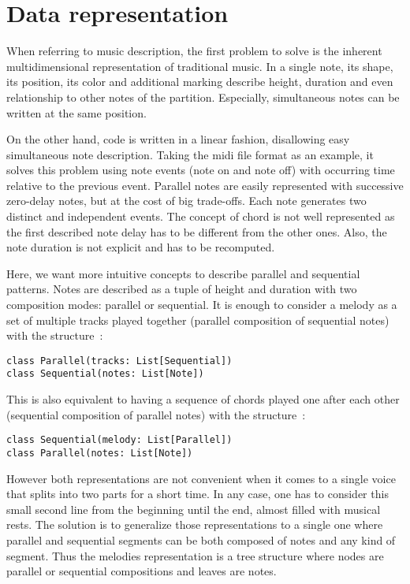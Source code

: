 \documentclass[twocolumn, 11pt]{article}
\begin{document}
\section{Data representation}

When referring to music description, the first problem to solve is the inherent multidimensional representation of traditional music. In a single note, its shape, its position, its color and additional marking describe height, duration and even relationship to other notes of the partition.
Especially, simultaneous notes can be written at the same position.

On the other hand, code is written in a linear fashion, disallowing easy simultaneous note description.
Taking the midi file format as an example, it solves this problem using note events (note on and note off) with occurring time relative to the previous event.
Parallel notes are easily represented with successive zero-delay notes, but at the cost of big trade-offs. Each note generates two distinct and independent events. The concept of chord is not well represented as the first described note delay has to be different from the other ones.
Also, the note duration is not explicit and has to be recomputed.

Here, we want more intuitive concepts to describe parallel and sequential patterns. Notes are described as a tuple of height and duration with two composition modes: parallel or sequential.
It is enough to consider a melody as a set of multiple tracks played together (parallel composition of sequential notes) with the structure~:
\begin{lstlisting}
class Parallel(tracks: List[Sequential])
class Sequential(notes: List[Note])
\end{lstlisting}

This is also equivalent to having a sequence of chords played one after each other (sequential composition of parallel notes) with the structure~:
\begin{lstlisting}
class Sequential(melody: List[Parallel])
class Parallel(notes: List[Note])
\end{lstlisting}

However both representations are not convenient when it comes to a single voice that splits into two parts for a short time.
In any case, one has to consider this small second line from the beginning until the end, almost filled with musical rests.
The solution is to generalize those representations to a single one where parallel and sequential segments can be both composed of notes and any kind of segment.
Thus the melodies representation is a tree structure where nodes are parallel or sequential compositions and leaves are notes.
\end{document}
